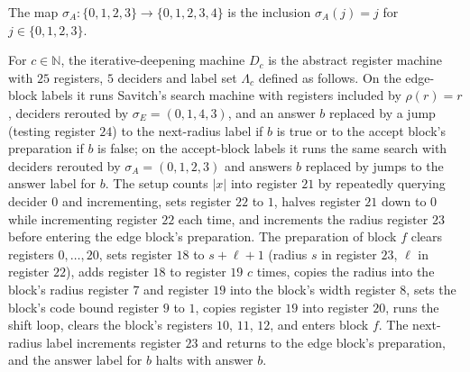 \begin{definition}
\label{Complexity.LogProg.SavitchARM.dpσA}
\leanok
The map $\sigma_A:\{0,1,2,3\}\to\{0,1,2,3,4\}$ is the inclusion $\sigma_A(j)=j$ for
$j\in\{0,1,2,3\}$.
\end{definition}

\begin{definition}
\label{Complexity.LogProg.SavitchARM.dpD}
\leanok
{}
For $c\in\mathbb{N}$, the iterative-deepening machine $D_c$ is the abstract register machine with
$25$ registers, $5$ deciders and label set $\Lambda_c$ defined as follows. On the edge-block labels
it runs Savitch's search machine with registers included by $\rho(r)=r$, deciders rerouted by
$\sigma_E=(0,1,4,3)$, and an answer $b$ replaced by a jump (testing register $24$) to the next-radius
label if $b$ is true or to the accept block's preparation if $b$ is false; on the accept-block
labels it runs the same search with deciders rerouted by $\sigma_A=(0,1,2,3)$ and answers $b$
replaced by jumps to the answer label for $b$. The setup counts $|x|$ into register $21$ by
repeatedly querying decider $0$ and incrementing, sets register $22$ to $1$, halves register $21$
down to $0$ while incrementing register $22$ each time, and increments the radius register $23$
before entering the edge block's preparation. The preparation of block $f$ clears registers
$0,\dots,20$, sets register $18$ to $s+\ell+1$ (radius $s$ in register $23$, $\ell$ in register
$22$), adds register $18$ to register $19$ $c$ times, copies the radius into the block's radius
register $7$ and register $19$ into the block's width register $8$, sets the block's code bound
register $9$ to $1$, copies register $19$ into register $20$, runs the shift loop, clears the block's
registers $10$, $11$, $12$, and enters block $f$. The next-radius label increments register $23$ and
returns to the edge block's preparation, and the answer label for $b$ halts with answer $b$.
\end{definition}

